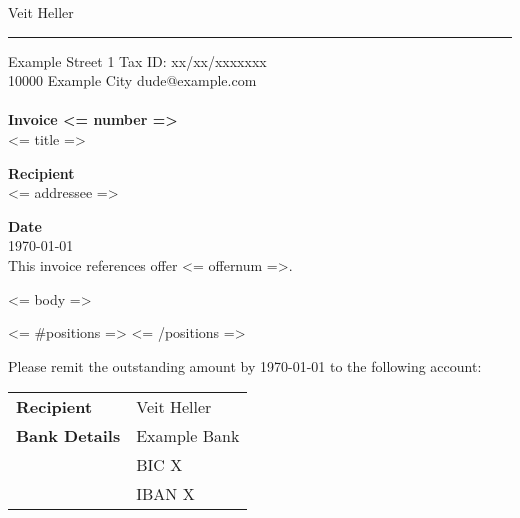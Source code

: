 \documentclass{invoice}
\def \tab {\hspace*{3ex}}
\begin{document}
\hfil{\Huge Veit Heller}\hfil
\bigskip\break
\hrule
\bigskip

Example Street 1 \hfill Tax ID: xx/xx/xxxxxxx \\
10000 Example City \hfill dude@example.com
\\ \\
{\bf Invoice <= number =>} \\
\tab <= title =>

{\bf Recipient} \\
<= addressee =>

{\bf Date} \\
\tab \today \\


This invoice references offer <= offernum =>.

<= body =>


\begin{invoiceTable}
\hline
<= #positions =>
<= /positions =>
\end{invoiceTable}

Please remit the outstanding amount by \AdvanceDate[14]\today\thinspace
to the following account:

\begin{tabular}{l l}
{\bf Recipient} & Veit Heller \\
{\bf Bank Details} & Example Bank \\
& BIC X \\
& IBAN X
\end{tabular}
\end{document}
